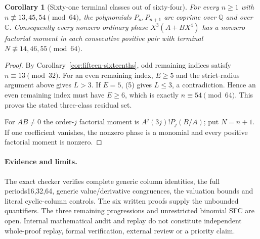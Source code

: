 \documentclass[11pt]{article}
\newtheorem{corollary}{Corollary}
\begin{document}
\begin{corollary}[Sixty-one terminal classes out of sixty-four]
\label{cor:sixty-one-sixty-four}
For every $n\ge1$ with
$n\not\equiv13,45,54\pmod{64}$, the polynomials
$P_n,P_{n+1}$ are coprime over $\mathbb Q$ and over $\mathbb C$.
Consequently every nonzero ordinary phase $X^3(A+BX^4)$ has
a nonzero factorial moment in each consecutive positive pair
with terminal $N\not\equiv14,46,55\pmod{64}$.
\end{corollary}
\begin{proof}
By Corollary~\ref{cor:fifteen-sixteenths}, odd remaining indices
satisfy $n\equiv13\pmod{32}$.
For an even remaining index, $E\ge5$ and the strict-radius
argument above gives $L>3$.
If $E=5$, (5) gives $L\le3$, a contradiction.
Hence an even remaining index must have $E\ge6$,
which is exactly $n\equiv54\pmod{64}$.
This proves the stated three-class residual set.

For $AB\ne0$ the order-$j$ factorial moment is
$A^j(3j)!P_j(B/A)$; put $N=n+1$.
If one coefficient vanishes, the nonzero phase is a monomial
and every positive factorial moment is nonzero.
\end{proof}

\paragraph{Evidence and limits.}
The exact checker verifies complete generic column identities,
the full periods16,32,64, generic value/derivative congruences,
the valuation bounds and literal cyclic-column controls.
The six written proofs supply the unbounded quantifiers.
The three remaining progressions and unrestricted binomial SFC
are open. Internal mathematical audit and replay do not constitute
independent whole-proof replay, formal verification, external review
or a priority claim.
\end{document}
